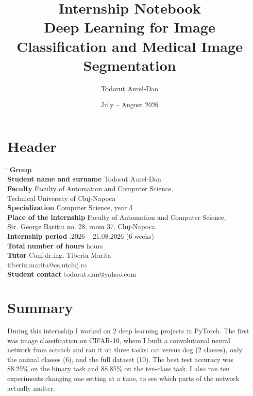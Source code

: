 \documentclass[11pt,a4paper]{article}
\title{\vspace{-1.5cm}\textbf{Internship Notebook}\\[0.3cm]
\large Deep Learning for Image Classification and Medical Image Segmentation}
\author{Todoruț Aurel-Dan}
\date{July -- August 2026}
\begin{document}
\maketitle
\thispagestyle{fancy}

\section{Header}

\begin{tabbing}
\hspace{6.4cm}\= \kill
\textbf{Group}  \\[2pt]
\textbf{Student name and surname} \> Todoruț Aurel-Dan \\[2pt]
\textbf{Faculty} \> Faculty of Automation and Computer Science, \\
                 \> Technical University of Cluj-Napoca \\[2pt]
\textbf{Specialization} \> Computer Science, year 3 \\[2pt]
\textbf{Place of the internship} \> Faculty of Automation and Computer Science, \\
                 \> Str. George Barițiu no. 28, room 37, Cluj-Napoca \\[2pt]
\textbf{Internship period} .2026 -- 21.08.2026 (6 weeks) \\[2pt]
\textbf{Total number of hours}  hours \\[2pt]
\textbf{Tutor} \> Conf.dr.ing. Tiberiu Marita \\
                 \> tiberiu.marita@cs.utcluj.ro \\[2pt]
\textbf{Student contact} \> todorut.dan@yahoo.com
\end{tabbing}

\section{Summary}

During this internship I worked on 2 deep learning projects in PyTorch. The
first was image classification on CIFAR-10, where I built a convolutional neural
network from scratch and ran it on three tasks: cat versus dog (2 classes), only
the animal classes (6), and the full dataset (10). The best test accuracy was
88.25\% on the binary task and 88.85\% on the ten-class task. I also ran ten
experiments changing one setting at a time, to see which parts of the network
actually matter.
\end{document}
